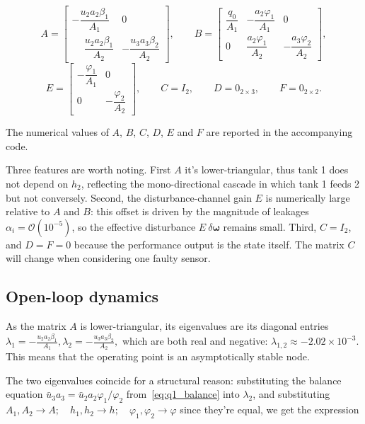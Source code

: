 \documentclass[10pt,a4paper]{scrartcl}
\begin{document}
\begin{equation}
    A=\begin{bmatrix}
        -\dfrac{u_2a_2\beta_1}{A_1} & 0\\[.2cm]
        \phantom{-}\dfrac{u_2a_2\beta_1}{A_2} & -\dfrac{u_3a_3\beta_2}{A_2}
      \end{bmatrix},\qquad
    B=\begin{bmatrix}
        \dfrac{q_0}{A_1} & -\dfrac{a_2\varphi_1}{A_1} & 0\\[.2cm]
        0 & \dfrac{a_2\varphi_1}{A_2} & -\dfrac{a_3\varphi_2}{A_2}
      \end{bmatrix},
    \label{eq:q1_A}
\end{equation}
\begin{equation}
    E=\begin{bmatrix}
        -\dfrac{\varphi_1}{A_1} & 0\\[.2cm]
        0 & -\dfrac{\varphi_2}{A_2}
      \end{bmatrix},\qquad
    C=I_2,\qquad D=0_{2\times3},\qquad F=0_{2\times2}.
    \label{eq:q1_B}
\end{equation}

The numerical values of $A$, $B$, $C$, $D$, $E$ and $F$ are reported in the accompanying code.

Three features are worth noting. First $A$ it's lower-triangular, thus tank 1 does not depend on $h_2$, reflecting the mono-directional cascade in which tank 1 feeds 2 but not conversely. Second, the disturbance-channel gain $E$ is numerically large relative to $A$ and $B$: this offset is driven by the magnitude of leakages $\alpha_i = \mathcal O(10^{-5})$, so the effective disturbance $E \ \delta \bm \omega $ remains small. 
Third, $C=I_2$, and $D=F=0$ because the performance output is the state itself. The matrix $C$ will change when considering one faulty sensor. 

\subsection{Open-loop dynamics}

As the matrix $A$ is lower-triangular, its eigenvalues are its diagonal entries  $\lambda_1=-\frac{u_2a_2\beta_1}{A_1},\lambda_2=-\frac{u_3a_3\beta_2}{A_2},$
which are both real and negative: $\lambda_{1,2}\approx-2.02\times10^{-3}$. This means that the operating point is an asymptotically stable node. 

The two eigenvalues coincide for a structural reason: substituting the balance equation $\bar u_3a_3=\bar u_2a_2\varphi_1/\varphi_2$ from~\eqref{eq:q1_balance}
into $\lambda_2$, and substituting $A_1, A_2 \to A; \quad h_1, h_2 \to h; \quad \varphi_1, \varphi_2 \to \varphi$ 
since they're equal, we get the expression 
\end{document}
